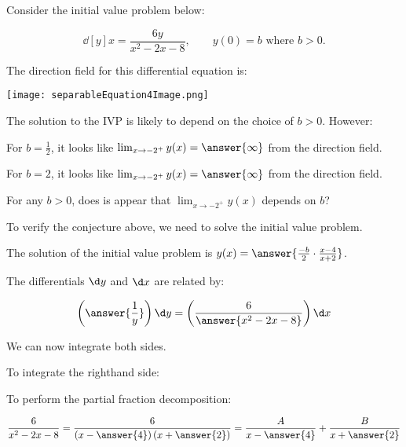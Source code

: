 \documentclass{ximera}
\author{Jim Talamo}
\begin{document}
\begin{exercise}
Consider the initial value problem below:

\[
\dd[y]{x} = \frac{6y}{x^2-2x-8}  , \qquad y(0)=b \textrm{ where } b>0.
\]

The direction field for this differential equation is:

 \begin{image}
  \texttt{[image: separableEquation4Image.png]}
\end{image}

\begin{exercise}
The solution to the IVP is likely to depend on the choice of $b>0$.  However:

For $b=\frac{1}{2}$, it looks like $\lim_{x\to -2^+}y(x) = \answer{\infty} $ from the direction field.

For $b=2$, it looks like $\lim_{x\to -2^+} y(x) = \answer{\infty}$ from the direction field.

For any $b>0$, does is appear that $\lim_{x\to -2^+} y(x)$ depends on $b$?
\begin{multipleChoice}
\end{multipleChoice}
\end{exercise}

\begin{exercise}
To verify the conjecture above, we need to solve the initial value problem.

The solution of the initial value problem is $y(x) = \answer{ \frac{-b}{2} \cdot \frac{x-4}{x+2} }$.

\begin{hint}
The differentials $\d y$ and $\d x$ are related by:

\[
\left(\answer{\frac{1}{y}} \right) \d y = \left(\frac{6}{\answer{x^2-2x-8} } \right) \d x
\]

\begin{question}
We can now integrate both sides.

To integrate the righthand side:

\begin{multipleChoice}
\end{multipleChoice}

To perform the partial fraction decomposition:

\[
\frac{6}{x^2-2x-8} = \frac{6}{\left(x-\answer{4}\right)\left(x+\answer{2}\right)} = \frac{A}{x-\answer{4}}+\frac{B}{x+\answer{2}}
\]


\end{question}
\end{hint}
\end{exercise}
\end{exercise}
\end{document}
